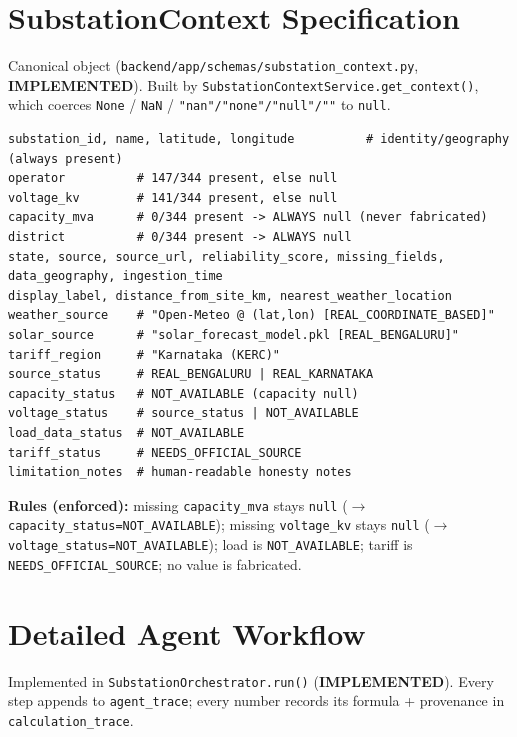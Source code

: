 \documentclass[11pt,a4paper]{article}
\newcommand{\stImpl}{\textcolor{cok}{\textbf{IMPLEMENTED}}}
\newcommand{\code}[1]{\texttt{\small #1}}
\begin{document}
\section{SubstationContext Specification}
Canonical object (\code{backend/app/schemas/substation\_context.py}, \stImpl). Built by
\code{SubstationContextService.get\_context()}, which coerces \code{None} / \code{NaN} /
\code{"nan"/"none"/"null"/""} to \code{null}.

\begin{lstlisting}
substation_id, name, latitude, longitude          # identity/geography (always present)
operator          # 147/344 present, else null
voltage_kv        # 141/344 present, else null
capacity_mva      # 0/344 present -> ALWAYS null (never fabricated)
district          # 0/344 present -> ALWAYS null
state, source, source_url, reliability_score, missing_fields, data_geography, ingestion_time
display_label, distance_from_site_km, nearest_weather_location
weather_source    # "Open-Meteo @ (lat,lon) [REAL_COORDINATE_BASED]"
solar_source      # "solar_forecast_model.pkl [REAL_BENGALURU]"
tariff_region     # "Karnataka (KERC)"
source_status     # REAL_BENGALURU | REAL_KARNATAKA
capacity_status   # NOT_AVAILABLE (capacity null)
voltage_status    # source_status | NOT_AVAILABLE
load_data_status  # NOT_AVAILABLE
tariff_status     # NEEDS_OFFICIAL_SOURCE
limitation_notes  # human-readable honesty notes
\end{lstlisting}

\noindent\textbf{Rules (enforced):} missing \code{capacity\_mva} stays \code{null}
($\rightarrow$ \code{capacity\_status=NOT\_AVAILABLE}); missing \code{voltage\_kv} stays
\code{null} ($\rightarrow$ \code{voltage\_status=NOT\_AVAILABLE}); load is \code{NOT\_AVAILABLE};
tariff is \code{NEEDS\_OFFICIAL\_SOURCE}; no value is fabricated.

\section{Detailed Agent Workflow}
Implemented in \code{SubstationOrchestrator.run()} (\stImpl). Every step appends to
\code{agent\_trace}; every number records its formula + provenance in \code{calculation\_trace}.
\end{document}
